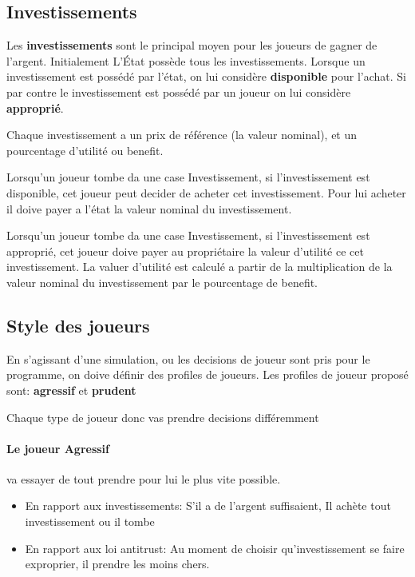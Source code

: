 \documentclass[12pt]{article}
\begin{document}
    \subsection{Investissements}
	Les \textbf{investissements} sont le principal moyen pour les joueurs de gagner de l'argent. 
	Initialement L'\'Etat possède tous les investissements.
	Lorsque un investissement est possédé par l'état, on lui considère \textbf{disponible} pour l'achat. 
	Si par contre le investissement est possédé par un joueur on lui considère \textbf{approprié}.
	
	Chaque investissement a un prix de référence (la valeur nominal),  et un pourcentage d'utilité ou benefit.
	
	Lorsqu'un joueur tombe da une case Investissement, si l'investissement est disponible, cet joueur peut decider de acheter cet investissement. 
	Pour lui acheter il doive payer a l'état la valeur nominal du investissement. 
	
	Lorsqu'un joueur tombe da une case Investissement, si l'investissement est approprié, cet joueur doive payer au propriétaire la valeur d'utilité ce cet investissement. 
	La valuer d'utilité est calculé a partir de la multiplication de la valeur nominal du investissement par le pourcentage de benefit. 
	 
	
    \subsection{Style des joueurs}
    En s'agissant d'une simulation, ou les decisions de joueur sont pris pour le programme, on doive définir des profiles de joueurs.
    Les profiles de joueur proposé sont: \textbf{agressif} et \textbf{prudent}
    
   Chaque type de joueur donc vas prendre decisions différemment  
   
   \paragraph {Le joueur Agressif}  va essayer de tout prendre pour lui le plus vite possible. 
   \begin{itemize}
   	\item En rapport aux investissements: S'il a de l'argent suffisaient,  Il achète tout investissement ou il tombe
	\item En rapport aux loi antitrust: Au moment de choisir qu'investissement se faire exproprier, il prendre les moins chers.
   \end{itemize}
   
\end{document}
